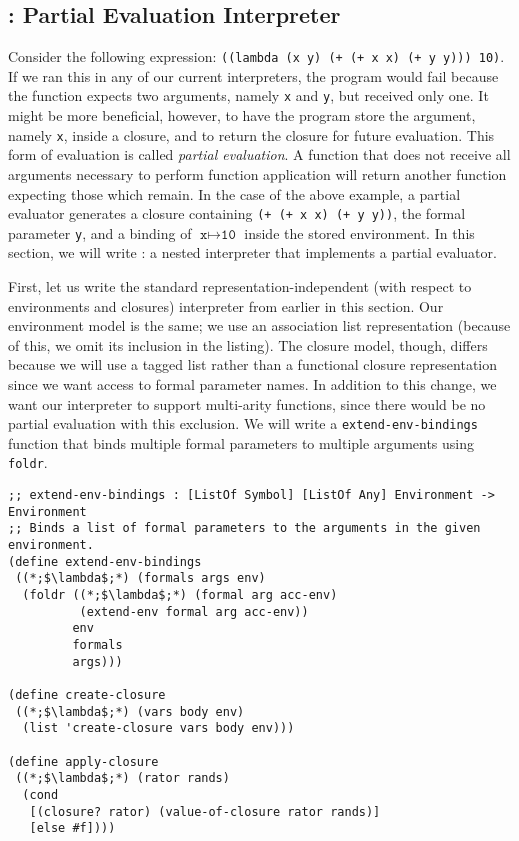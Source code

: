 \clearpage
\subsection*{: Partial Evaluation Interpreter}

Consider the following expression: \texttt{((lambda (x y) (+ (+ x x) (+ y y))) 10)}. If we ran this in any of our current interpreters, the program would fail because the function expects two arguments, namely \texttt{x} and \texttt{y}, but received only one. It might be more beneficial, however, to have the program store the argument, namely \texttt{x}, inside a closure, and to return the closure for future evaluation. This form of evaluation is called \textit{partial evaluation}. A function that does not receive all arguments necessary to perform function application will return another function expecting those which remain. In the case of the above example, a partial evaluator generates a closure containing \texttt{(+ (+ x x) (+ y y))}, the formal parameter \texttt{y}, and a binding of $\texttt{x} \mapsto \texttt{10}$ inside the stored environment. In this section, we will write : a nested interpreter that implements a partial evaluator.

First, let us write the standard representation-independent (with respect to environments and closures) interpreter from earlier in this section. Our environment model is the same; we use an association list representation (because of this, we omit its inclusion in the listing). The closure model, though, differs because we will use a tagged list rather than a functional closure representation since we want access to formal parameter names. In addition to this change, we want our interpreter to support multi-arity functions, since there would be no partial evaluation with this exclusion. We will write a \texttt{extend-env-bindings} function that binds multiple formal parameters to multiple arguments using \texttt{foldr}.

\begin{cl}[]{}
\begin{lstlisting}[language=MyScheme]
;; extend-env-bindings : [ListOf Symbol] [ListOf Any] Environment -> Environment
;; Binds a list of formal parameters to the arguments in the given environment.
(define extend-env-bindings
 ((*;$\lambda$;*) (formals args env)
  (foldr ((*;$\lambda$;*) (formal arg acc-env)
          (extend-env formal arg acc-env))
         env
         formals
         args)))

(define create-closure
 ((*;$\lambda$;*) (vars body env)
  (list 'create-closure vars body env)))
         
(define apply-closure
 ((*;$\lambda$;*) (rator rands)
  (cond
   [(closure? rator) (value-of-closure rator rands)]
   [else #f])))
\end{lstlisting}
\end{cl}

